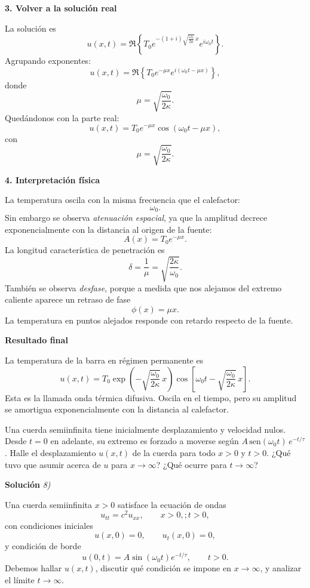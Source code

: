\documentclass[11pt,spanish]{article}
\newcounter{problema}
\newcommand{\prob}{\stepcounter{problema} \vspace{.5cm} \noindent{\bf Problema \arabic{problema}: }}
\begin{document}
{\bf 3. Volver a la solución real}

La solución es
$$
u(x,t)
=
\Re
\left\{
T_0
e^{-(1+i)\sqrt{\frac{\omega_0}{2\kappa}}\,x}
e^{i\omega_0 t}
\right\}.
$$
Agrupando exponentes:
$$
u(x,t)
=
\Re
\left\{
T_0
e^{-\mu x}
e^{i(\omega_0 t-\mu x)}
\right\},
$$
donde
$$
\mu
=
\sqrt{\frac{\omega_0}{2\kappa}}.
$$
Qued\'andonos con la parte real:
$$
\boxed{
u(x,t)
=
T_0
e^{-\mu x}
\cos(\omega_0 t-\mu x),
}
$$
con
$$
\boxed{
\mu=
\sqrt{\frac{\omega_0}{2\kappa}}.
}
$$

{\bf 4. Interpretación física}

La temperatura oscila con la misma frecuencia que el calefactor:
$$
\omega_0.
$$
Sin embargo se observa {\em atenuación espacial}, ya que la amplitud decrece exponencialmente con la distancia al origen de la fuente:
$$
A(x)=T_0e^{-\mu x}.
$$
La longitud característica de penetración es
$$
\boxed{
\delta
=
\frac1\mu
=
\sqrt{\frac{2\kappa}{\omega_0}}.
}
$$
Tambi\'en se observa {\em desfase}, porque a medida que nos alejamos del extremo caliente aparece un retraso de fase
$$
\phi(x)=\mu x.
$$
La temperatura en puntos alejados responde con retardo respecto de la fuente.

{\bf Resultado final}

La temperatura de la barra en régimen permanente es
$$
\boxed{
u(x,t)
=
T_0
\exp\left(
-\sqrt{\frac{\omega_0}{2\kappa}}\,x
\right)
\cos\left[
\omega_0 t
-
\sqrt{\frac{\omega_0}{2\kappa}}\,x
\right].
}
$$
Esta es la llamada onda térmica difusiva.
Oscila en el tiempo, pero su amplitud se amortigua exponencialmente con la distancia al calefactor.




\prob Una cuerda semiinfinita tiene inicialmente desplazamiento y velocidad nulos. Desde \(t=0\) en adelante, su extremo es forzado a moverse según \(A\,\text{sen}(\omega_0 t)\,e^{-t/\tau}\). Halle el desplazamiento \(u(x,t)\) de la cuerda para todo \(x>0\) y \(t>0\). ¿Qué tuvo que asumir acerca de \(u\) para \(x\to\infty\)? ¿Qué ocurre para \(t\to\infty\)?

\vspace{0.5cm}
{\bf Soluci\'on }{\em 8)}
\vspace{0.5cm}

Una cuerda semiinfinita $x>0$ satisface la ecuación de ondas
$$
u_{tt}=c^2u_{xx},
\qquad x>0,; t>0,
$$
con condiciones iniciales
$$
u(x,0)=0,
\qquad
u_t(x,0)=0,
$$
y condición de borde
$$
u(0,t)=A\sin(\omega_0 t)e^{-t/\tau},
\qquad t>0.
$$
Debemos hallar $u(x,t)$, discutir qué condición se impone en $x\to\infty$, y analizar el límite $t\to\infty$. 
\end{document}
